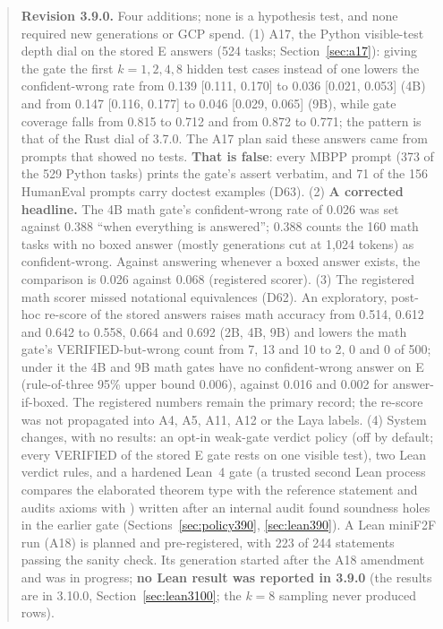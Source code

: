 \documentclass[11pt,a4paper]{article}
\newcommand{\code}[1]{\texttt{\detokenize{#1}}}
\begin{document}
\begin{abstract}
\textbf{Revision 3.9.0.} Four additions; none is a hypothesis test, and none required new generations or GCP spend. (1) A17, the Python visible-test depth dial on the stored E answers (524 tasks; Section~\ref{sec:a17}): giving the gate the first $k=1,2,4,8$ hidden test cases instead of one lowers the confident-wrong rate from 0.139 [0.111, 0.170] to 0.036 [0.021, 0.053] (4B) and from 0.147 [0.116, 0.177] to 0.046 [0.029, 0.065] (9B), while gate coverage falls from 0.815 to 0.712 and from 0.872 to 0.771; the pattern is that of the Rust dial of 3.7.0. The A17 plan said these answers came from prompts that showed no tests. \textbf{That is false}: every MBPP prompt (373 of the 529 Python tasks) prints the gate's assert verbatim, and 71 of the 156 HumanEval prompts carry doctest examples (D63). (2) \textbf{A corrected headline.} The 4B math gate's confident-wrong rate of 0.026 was set against 0.388 ``when everything is answered''; 0.388 counts the 160 math tasks with no boxed answer (mostly generations cut at 1,024 tokens) as confident-wrong. Against answering whenever a boxed answer exists, the comparison is 0.026 against 0.068 (registered scorer). (3) The registered math scorer missed notational equivalences (D62). An exploratory, post-hoc re-score of the stored answers raises math accuracy from 0.514, 0.612 and 0.642 to 0.558, 0.664 and 0.692 (2B, 4B, 9B) and lowers the math gate's VERIFIED-but-wrong count from 7, 13 and 10 to 2, 0 and 0 of 500; under it the 4B and 9B math gates have no confident-wrong answer on E (rule-of-three 95\% upper bound 0.006), against 0.016 and 0.002 for answer-if-boxed. The registered numbers remain the primary record; the re-score was not propagated into A4, A5, A11, A12 or the Laya labels. (4) System changes, with no results: an opt-in weak-gate verdict policy (off by default; every VERIFIED of the stored E gate rests on one visible test), two Lean verdict rules, and a hardened Lean~4 gate (a trusted second Lean process compares the elaborated theorem type with the reference statement and audits axioms with \code{collectAxioms}) written after an internal audit found soundness holes in the earlier gate (Sections~\ref{sec:policy390}, \ref{sec:lean390}). A Lean miniF2F run (A18) is planned and pre-registered, with 223 of 244 statements passing the sanity check. Its generation started after the A18 amendment and was in progress; \textbf{no Lean result was reported in 3.9.0} (the results are in 3.10.0, Section~\ref{sec:lean3100}; the $k=8$ sampling never produced rows).


\end{abstract}
\end{document}
